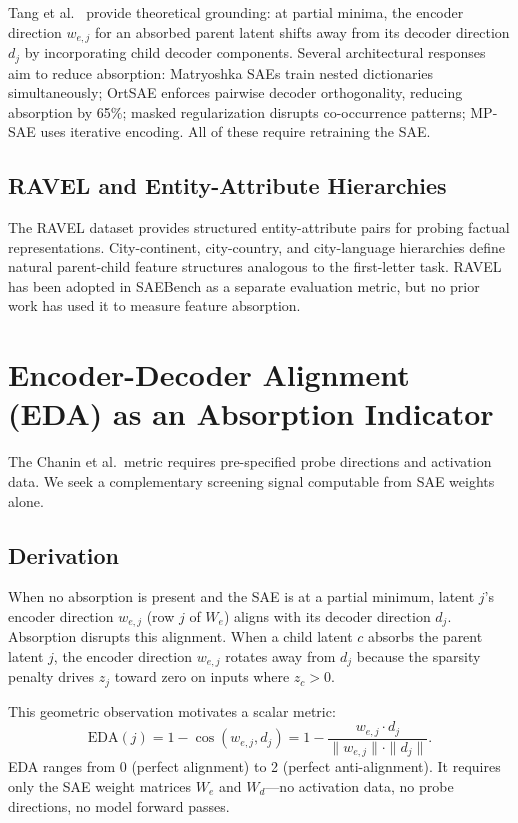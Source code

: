 \documentclass{article}
\begin{document}
Tang et al.\ \cite{tang2025unified} provide theoretical grounding: at partial minima, the encoder direction $w_{e,j}$ for an absorbed parent latent shifts away from its decoder direction $d_j$ by incorporating child decoder components. Several architectural responses aim to reduce absorption: Matryoshka SAEs \cite{bussmann2025matryoshka} train nested dictionaries simultaneously; OrtSAE \cite{korznikov2025ortsae} enforces pairwise decoder orthogonality, reducing absorption by 65\%; masked regularization \cite{narayanaswamy2026masked} disrupts co-occurrence patterns; MP-SAE \cite{costa2025mpsae} uses iterative encoding. All of these require retraining the SAE.

\subsection{RAVEL and Entity-Attribute Hierarchies}

The RAVEL dataset \cite{huang2024ravel} provides structured entity-attribute pairs for probing factual representations. City-continent, city-country, and city-language hierarchies define natural parent-child feature structures analogous to the first-letter task. RAVEL has been adopted in SAEBench as a separate evaluation metric, but no prior work has used it to measure feature absorption.

\section{Encoder-Decoder Alignment (EDA) as an Absorption Indicator}

The Chanin et al.\ metric requires pre-specified probe directions and activation data. We seek a complementary screening signal computable from SAE weights alone.

\subsection{Derivation}

When no absorption is present and the SAE is at a partial minimum, latent $j$'s encoder direction $w_{e,j}$ (row $j$ of $W_e$) aligns with its decoder direction $d_j$. Absorption disrupts this alignment. When a child latent $c$ absorbs the parent latent $j$, the encoder direction $w_{e,j}$ rotates away from $d_j$ because the sparsity penalty drives $z_j$ toward zero on inputs where $z_c > 0$.

This geometric observation motivates a scalar metric:
\begin{equation}
\text{EDA}(j) = 1 - \cos(w_{e,j}, d_j) = 1 - \frac{w_{e,j} \cdot d_j}{\|w_{e,j}\| \cdot \|d_j\|}.
\tag{2}
\end{equation}
EDA ranges from 0 (perfect alignment) to 2 (perfect anti-alignment). It requires only the SAE weight matrices $W_e$ and $W_d$---no activation data, no probe directions, no model forward passes.
\end{document}
